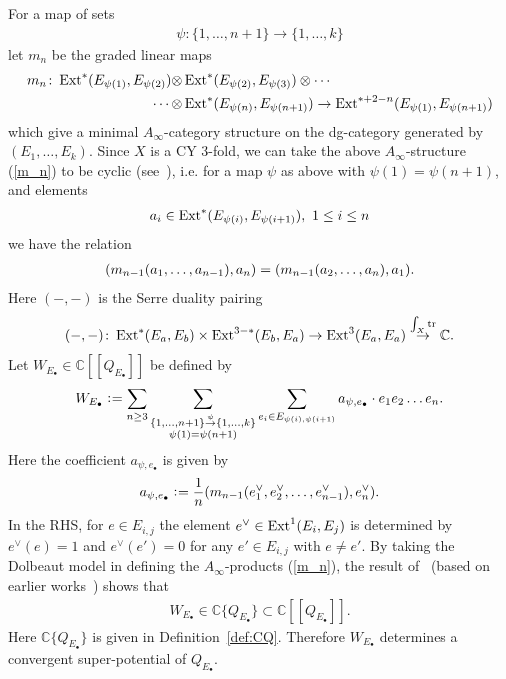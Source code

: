 \documentclass[11pt]{amsart}
\theoremstyle{plain}
\theoremstyle{definition}
\theoremstyle{remark}
\newcommand{\Ext}{\mathop{\rm Ext}\nolimits}
\newcommand{\lkakko}{[\![}
\newcommand{\rkakko}{]\!]}
\begin{document}
For a map of sets
\begin{align*}
\psi \colon \{1, \ldots, n+1\} \to \{1, \ldots, k\}
\end{align*}
let
$m_n$ be the graded linear maps
\begin{align}\notag
m_n \colon 
\Ext^{\ast}(E_{\psi(1)}, E_{\psi(2)}) \otimes 
&\Ext^{\ast}(E_{\psi(2)}, E_{\psi(3)}) \otimes
\cdots \\
\cdots \otimes 
&\Ext^{\ast}(E_{\psi(n)}, E_{\psi(n+1)})  
\label{m_n}
\to \Ext^{\ast+2-n}(E_{\psi(1)}, E_{\psi(n+1)})
\end{align}
which give a minimal $A_{\infty}$-category structure 
on the dg-category generated by $(E_1, \ldots, E_k)$. 
Since $X$ is a CY 3-fold, we can take 
the above 
$A_{\infty}$-structure (\ref{m_n})
to be cyclic (see~\cite{MR1876072}), i.e. 
for a map 
$\psi$ as above with 
$\psi(1)=\psi(n+1)$, and elements
\begin{align*}
a_i \in \Ext^{\ast}(E_{\psi(i)}, E_{\psi(i+1)}), \ 1\le i\le  n
\end{align*}
we have the relation
\begin{align}\notag
(m_{n-1}(a_1, \ldots, a_{n-1}), a_{n})=(m_{n-1}(a_2, \ldots, a_{n}), a_1). 
\end{align}
Here
$(-, -)$ is the Serre duality pairing
\begin{align}\notag
(-, -) \colon 
\Ext^{\ast}(E_a, E_b) \times \Ext^{3-\ast}(E_b, E_a)
\to \Ext^3(E_a, E_a) \stackrel{\int_X \mathrm{tr}}{\to} \mathbb{C}.
\end{align} 
Let $W_{E_{\bullet}} \in \mathbb{C}\lkakko Q_{E_{\bullet}} \rkakko$
be defined by
\begin{align}\label{def:WE}
W_{E_{\bullet}} \cneq \sum_{n\ge 3}
\sum_{\begin{subarray}{c} 
\{1, \ldots, n+1 \} \stackrel{\psi}{\to} \{1, \ldots, k\} \\
\psi(1)=\psi(n+1)
\end{subarray}}
\sum_{e_i \in E_{\psi(i), \psi(i+1)}}
a_{\psi, e_{\bullet}} \cdot e_1 e_2 \ldots e_n. 
\end{align}
Here the coefficient $a_{\psi, e_{\bullet}}$ is given by 
\begin{align}\notag
a_{\psi, e_{\bullet}} \cneq 
\frac{1}{n}(m_{n-1}(e_1^{\vee}, e_2^{\vee}, \ldots, e_{n-1}^{\vee}), 
e_n^{\vee}). 
\end{align}
In the RHS, 
for $e \in E_{i, j}$
the element $e^{\vee} \in \Ext^1(E_i, E_j)$
is determined by 
$e^{\vee}(e)=1$ and 
$e^{\vee}(e')=0$ for any $e'  \in E_{i, j}$
with $e \neq e'$. 
By taking the Dolbeaut model in defining the $A_{\infty}$-products (\ref{m_n}), the result of~\cite[Lemma~4.1]{Todstack} (based on earlier 
works~\cite{MR1950958, JuTu})
shows that
\begin{align*}
W_{E_{\bullet}} \in \mathbb{C}\{ Q_{E_{\bullet}} \} \subset \mathbb{C}\lkakko Q_{E_{\bullet}} \rkakko .
\end{align*}
Here
$\mathbb{C}\{ Q_{E_{\bullet}} \}$
is given in Definition~\ref{def:CQ}. 
Therefore $W_{E_{\bullet}}$ determines 
a convergent super-potential of $Q_{E_{\bullet}}$.
\end{document}
